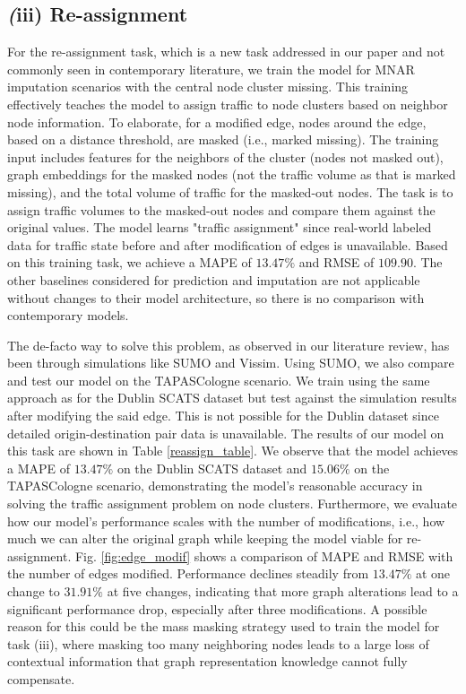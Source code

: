 \subsection*{\textit(iii) Re-assignment}
For the re-assignment task, which is a new task addressed in our paper and not commonly seen in contemporary literature, we train the model for MNAR imputation scenarios with the central node cluster missing. This training effectively teaches the model to assign traffic to node clusters based on neighbor node information. To elaborate, for a modified edge, nodes around the edge, based on a distance threshold, are masked (i.e., marked missing). The training input includes features for the neighbors of the cluster (nodes not masked out), graph embeddings for the masked nodes (not the traffic volume as that is marked missing), and the total volume of traffic for the masked-out nodes. The task is to assign traffic volumes to the masked-out nodes and compare them against the original values. The model learns "traffic assignment" since real-world labeled data for traffic state before and after modification of edges is unavailable. Based on this training task, we achieve a MAPE of $13.47\%$ and RMSE of $109.90$. The other baselines considered for prediction and imputation are not applicable without changes to their model architecture, so there is no comparison with contemporary models.

The de-facto way to solve this problem, as observed in our literature review, has been through simulations like SUMO\cite{sumo} and Vissim\cite{vissim}. Using SUMO, we also compare and test our model on the TAPASCologne scenario. We train using the same approach as for the Dublin SCATS dataset but test against the simulation results after modifying the said edge. This is not possible for the Dublin dataset since detailed origin-destination pair data is unavailable. The results of our model on this task are shown in Table \ref{reassign_table}. We observe that the model achieves a MAPE of $13.47\%$ on the Dublin SCATS dataset and $15.06\%$ on the TAPASCologne scenario, demonstrating the model's reasonable accuracy in solving the traffic assignment problem on node clusters. Furthermore, we evaluate how our model's performance scales with the number of modifications, i.e., how much we can alter the original graph while keeping the model viable for re-assignment. Fig. \ref{fig:edge_modif} shows a comparison of MAPE and RMSE with the number of edges modified. Performance declines steadily from $13.47\%$ at one change to $31.91\%$ at five changes, indicating that more graph alterations lead to a significant performance drop, especially after three modifications. A possible reason for this could be the mass masking strategy used to train the model for task (iii), where masking too many neighboring nodes leads to a large loss of contextual information that graph representation knowledge cannot fully compensate.


